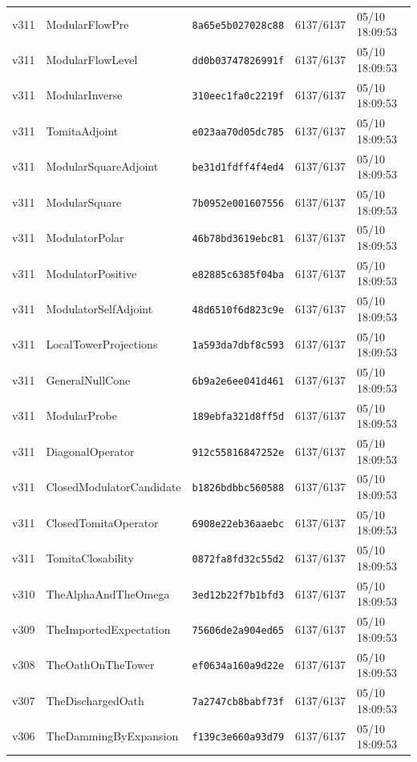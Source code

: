 \documentclass[11pt]{article}
\theoremstyle{definition}\newtheorem{deriv}{Derivation}
\begin{document}
{\begin{longtable}{@{}lllll@{}}
v311 & ModularFlowPre & \texttt{8a65e5b027028c88} & 6137/6137 & 05/10 18:09:53 \\
v311 & ModularFlowLevel & \texttt{dd0b03747826991f} & 6137/6137 & 05/10 18:09:53 \\
v311 & ModularInverse & \texttt{310eec1fa0c2219f} & 6137/6137 & 05/10 18:09:53 \\
v311 & TomitaAdjoint & \texttt{e023aa70d05dc785} & 6137/6137 & 05/10 18:09:53 \\
v311 & ModularSquareAdjoint & \texttt{be31d1fdff4f4ed4} & 6137/6137 & 05/10 18:09:53 \\
v311 & ModularSquare & \texttt{7b0952e001607556} & 6137/6137 & 05/10 18:09:53 \\
v311 & ModulatorPolar & \texttt{46b78bd3619ebc81} & 6137/6137 & 05/10 18:09:53 \\
v311 & ModulatorPositive & \texttt{e82885c6385f04ba} & 6137/6137 & 05/10 18:09:53 \\
v311 & ModulatorSelfAdjoint & \texttt{48d6510f6d823c9e} & 6137/6137 & 05/10 18:09:53 \\
v311 & LocalTowerProjections & \texttt{1a593da7dbf8c593} & 6137/6137 & 05/10 18:09:53 \\
v311 & GeneralNullCone & \texttt{6b9a2e6ee041d461} & 6137/6137 & 05/10 18:09:53 \\
v311 & ModularProbe & \texttt{189ebfa321d8ff5d} & 6137/6137 & 05/10 18:09:53 \\
v311 & DiagonalOperator & \texttt{912c55816847252e} & 6137/6137 & 05/10 18:09:53 \\
v311 & ClosedModulatorCandidate & \texttt{b1826bdbbc560588} & 6137/6137 & 05/10 18:09:53 \\
v311 & ClosedTomitaOperator & \texttt{6908e22eb36aaebc} & 6137/6137 & 05/10 18:09:53 \\
v311 & TomitaClosability & \texttt{0872fa8fd32c55d2} & 6137/6137 & 05/10 18:09:53 \\
v310 & TheAlphaAndTheOmega & \texttt{3ed12b22f7b1bfd3} & 6137/6137 & 05/10 18:09:53 \\
v309 & TheImportedExpectation & \texttt{75606de2a904ed65} & 6137/6137 & 05/10 18:09:53 \\
v308 & TheOathOnTheTower & \texttt{ef0634a160a9d22e} & 6137/6137 & 05/10 18:09:53 \\
v307 & TheDischargedOath & \texttt{7a2747cb8babf73f} & 6137/6137 & 05/10 18:09:53 \\
v306 & TheDammingByExpansion & \texttt{f139c3e660a93d79} & 6137/6137 & 05/10 18:09:53 \\

\end{longtable}}
\end{document}
